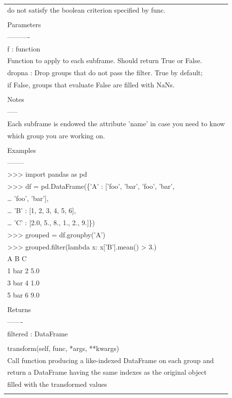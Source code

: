 \documentclass[11pt]{article}
\begin{document}
\begin{enumerate}
\begin{enumerate}
\begin{enumerate}
\begin{center}
\begin{tabular}{l}
do not satisfy the boolean criterion specified by func.\\
\\
Parameters\\
----------\\
f : function\\
Function to apply to each subframe. Should return True or False.\\
dropna : Drop groups that do not pass the filter. True by default;\\
if False, groups that evaluate False are filled with NaNs.\\
\\
Notes\\
-----\\
Each subframe is endowed the attribute 'name' in case you need to know\\
which group you are working on.\\
\\
Examples\\
--------\\
>>> import pandas as pd\\
>>> df = pd.DataFrame(\{'A' : ['foo', 'bar', 'foo', 'bar',\\
\ldots{}                           'foo', 'bar'],\\
\ldots{}                    'B' : [1, 2, 3, 4, 5, 6],\\
\ldots{}                    'C' : [2.0, 5., 8., 1., 2., 9.]\})\\
>>> grouped = df.groupby('A')\\
>>> grouped.filter(lambda x: x['B'].mean() > 3.)\\
A  B    C\\
1  bar  2  5.0\\
3  bar  4  1.0\\
5  bar  6  9.0\\
\\
Returns\\
-------\\
filtered : DataFrame\\
\\
transform(self, func, *args, **kwargs)\\
Call function producing a like-indexed DataFrame on each group and\\
return a DataFrame having the same indexes as the original object\\
filled with the transformed values\\
\\

\end{tabular}
\end{center}
\end{enumerate}
\end{enumerate}
\end{enumerate}
\end{document}
